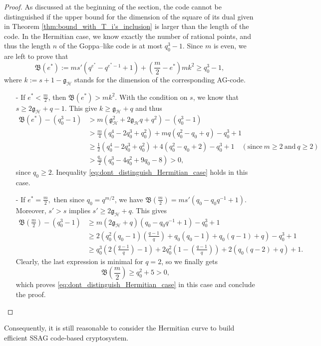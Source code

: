 \documentclass[a4paper]{article}
\theoremstyle{definition}
\theoremstyle{remark}
\newcommand{\calH}{\mathcal{H}}
\begin{document}
\begin{proof}
    As discussed at the beginning of the section, the code cannot be distinguished if the upper bound for the dimension of the square of its dual given in Theorem \ref{thm:bound_with_T_i's_inclusion} is larger than the length of the code. In the Hermitian case, we know exactly the number of rational points, and thus the length $n$ of the Goppa--like code is at most $q_0^3-1$. Since $m$ is even, we are left to prove that 
    \begin{equation} \label{eq:dont_distinguish_Hermitian_case}
    \mathfrak{B}(e^*) := ms'(q^{e^*}-q^{e^*-1}+1) + \left( \frac{m}{2}-e^*\right)mk^2 \geq q_0^3-1,
    \end{equation}
    where $k := s+1-\mathfrak{g}_{\calH}$ stands  for the dimension of the corresponding AG-code.
    \begin{itemize}
        \item [-] If $e^* < \frac{m}{2}$, then $\mathfrak{B}(e^*) > mk^2$. With the condition on $s$, we know that $s \geq 2\mathfrak{g}_{\calH}+q-1$. This give $k \geq \mathfrak{g}_{\calH}+q$ and thus
        \begin{align*}
\mathfrak{B}(e^*) - (q_0^3-1) 
&> m(\mathfrak{g}_{\calH}^2+2\mathfrak{g}_{\calH}q+q^2)-(q_0^3-1)\\
& > \frac{m}{4}(q_0^4-2q_0^3+q_0^2) + mq(q_0^2-q_0+q) -q_0^3+1 \\
& \geq \frac{1}{2}(q_0^4-2q_0^3+q_0^2)+4(q_0^2-q_0+2)-q_0^3+1 \quad (\mathrm{since} \ m\geq 2 \ \mathrm{and} \ q\geq 2)\\
& > \frac{q_0}{2} (q_0^3-4q_0^2+9q_0-8) > 0,
        \end{align*}
        since $q_0 \geq 2$. Inequality \eqref{eq:dont_distinguish_Hermitian_case} holds in this case.
        \item[-] If $e^* = \frac{m}{2},$ then since $q_0=q^{m/2}$, we have $\mathfrak{B}\left(\frac{m}{2}\right) = ms'(q_0-q_0q^{-1}+1)$. Moreover, $s'>s$ implies $s' \geq 2\mathfrak{g}_{\calH}+q$. This gives
        \begin{align*}
           \mathfrak{B}\left(\frac{m}{2}\right) - (q_0^3-1) 
           &\geq m(2\mathfrak{g}_{\calH}+q)(q_0-q_0q^{-1}+1)-q_0^3+1 \\ 
           &\geq 2\left(q_0^2(q_0-1)\left(\frac{q-1}{q}\right)+q_0(q_0-1)+q_0(q-1)+q\right)-q_0^3+1 \\
           & \geq q_0^3\left(2\left(\frac{q-1}{q}\right)-1\right) + 2q_0^2\left(1-\left(\frac{q-1}{q}\right)\right) + 2(q_0(q-2)+q)+1.
        \end{align*}
        Clearly, the last expression is minimal for $q=2$, so we finally gets
        $$\mathfrak{B}\left(\frac{m}{2}\right) \geq q_0^2 + 5 >0,$$
        which proves \eqref{eq:dont_distinguish_Hermitian_case} in this case and conclude the proof.
    \end{itemize}
\end{proof}

Consequently, it is still reasonable to consider the Hermitian curve to build efficient SSAG code-based cryptosystem.


\clearpage


\end{document}
